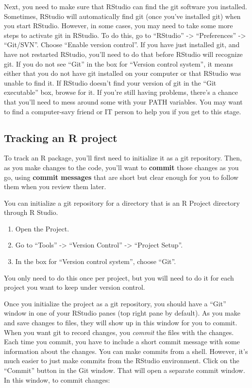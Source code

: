 \documentclass[]{tufte-book}
\providecommand{\tightlist}{%
  \setlength{\itemsep}{0pt}\setlength{\parskip}{0pt}}
\begin{document}
Next, you need to make sure that RStudio can find the git software you
installed. Sometimes, RStudio will automatically find git (once you've installed
git) when you start RStudio. However, in some cases, you may need to take some
more steps to activate git in RStudio. To do this, go to ``RStudio'' -\textgreater{}
``Preferences'' -\textgreater{} ``Git/SVN''. Choose ``Enable version control''. If you have just
installed git, and have not restarted RStudio, you'll need to do that before
RStudio will recognize git. If you do not see ``Git'' in the box for ``Version
control system'', it means either that you do not have git installed on your
computer or that RStudio was unable to find it. If RStudio doesn't find your
version of git in the ``Git executable'' box, browse for it. If you're still
having problems, there's a chance that you'll need to mess around some with your
PATH variables. You may want to find a computer-savy friend or IT person to help
you if you get to this stage.

\hypertarget{tracking-an-r-project}{%
\subsection{Tracking an R project}\label{tracking-an-r-project}}

To track an R package, you'll first need to initialize it as a git repository.
Then, as you make changes to the code, you'll want to \textbf{commit} those changes
as you go, using \textbf{commit messages} that are short but clear enough for you to
follow them when you review them later.

You can initialize a git repository for a directory that is an R Project
directory through R Studio.

\begin{enumerate}
\def\labelenumi{\arabic{enumi}.}
\tightlist
\item
  Open the Project.
\item
  Go to ``Tools'' -\textgreater{} ``Version Control'' -\textgreater{} ``Project Setup''.
\item
  In the box for ``Version control system'', choose ``Git''.
\end{enumerate}

You only need to do this once per project, but you will need to do it for each
project you want to keep under version control.

Once you initialize the project as a git repository, you should have a ``Git''
window in one of your RStudio panes (top right pane by default). As you make and
save changes to files, they will show up in this window for you to commit. When
you want git to record changes, you \emph{commit} the files with the changes. Each
time you commit, you have to include a short commit message with some
information about the changes. You can make commits from a shell. However, it's
much easier to just make commits from the RStudio environment. Click on the
``Commit'' button in the Git window. That will open a separate commit window. In
this window, to commit changes:
\end{document}
